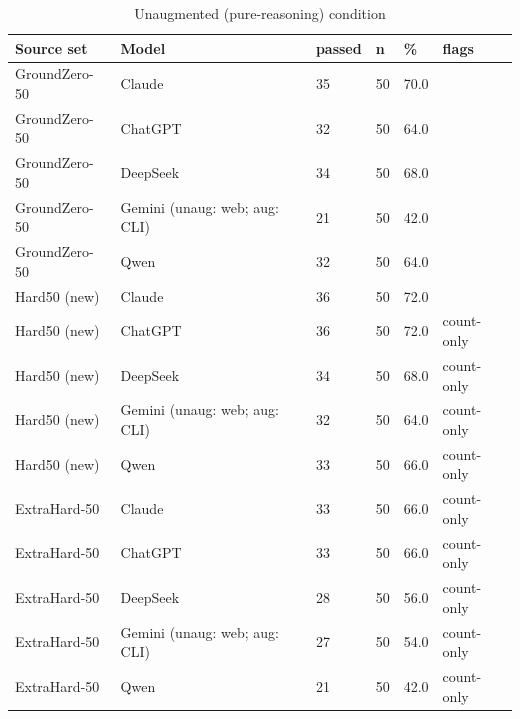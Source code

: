 
\begin{table}[t]\centering\small\caption{Unaugmented (pure-reasoning) condition}\label{tab:unaug}
\begin{tabular}{llllll}
\toprule
Source set & Model & passed & n & \% & flags \\
\midrule
GroundZero-50 & Claude & 35 & 50 & 70.0 &  \\
GroundZero-50 & ChatGPT & 32 & 50 & 64.0 &  \\
GroundZero-50 & DeepSeek & 34 & 50 & 68.0 &  \\
GroundZero-50 & Gemini (unaug: web; aug: CLI) & 21 & 50 & 42.0 &  \\
GroundZero-50 & Qwen & 32 & 50 & 64.0 &  \\
Hard50 (new) & Claude & 36 & 50 & 72.0 &  \\
Hard50 (new) & ChatGPT & 36 & 50 & 72.0 & count-only \\
Hard50 (new) & DeepSeek & 34 & 50 & 68.0 & count-only \\
Hard50 (new) & Gemini (unaug: web; aug: CLI) & 32 & 50 & 64.0 & count-only \\
Hard50 (new) & Qwen & 33 & 50 & 66.0 & count-only \\
ExtraHard-50 & Claude & 33 & 50 & 66.0 & count-only \\
ExtraHard-50 & ChatGPT & 33 & 50 & 66.0 & count-only \\
ExtraHard-50 & DeepSeek & 28 & 50 & 56.0 & count-only \\
ExtraHard-50 & Gemini (unaug: web; aug: CLI) & 27 & 50 & 54.0 & count-only \\
ExtraHard-50 & Qwen & 21 & 50 & 42.0 & count-only \\
\bottomrule
\end{tabular}
\end{table}


